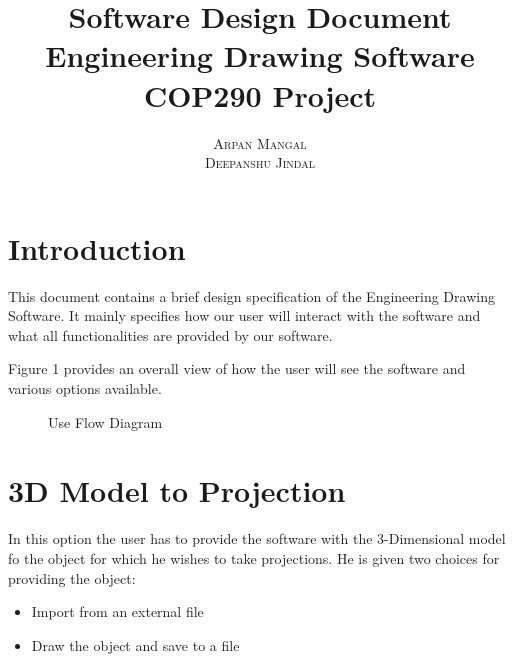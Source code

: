\documentclass[a4paper,12pt,openany]{report}
\title{\Huge \textbf{Software Design Document}
 \\
 \Huge \textbf{ Engineering Drawing Software} \vspace{10pt}\\\huge{COP290 Project }}
\author{\textsc{Arpan Mangal}
 \\
 \textsc{Deepanshu Jindal}}
\begin{document}
\maketitle



\chapter*{Introduction}
This document contains a brief design specification of the Engineering Drawing Software. It mainly specifies how our user will interact with the software and what all functionalities are provided by our software.

Figure 1 provides an overall view of how the user will see the software and various options available.
\begin{figure}[h]
	\centering
	\caption{Use Flow Diagram}
\end{figure}


\chapter*{3D Model to Projection}
In this option the user has to provide the software with the 3-Dimensional model fo the object for which he wishes to take projections. He is given two choices for providing the object:
\begin{itemize}
  \item Import from an external file
  \item Draw the object and save to a file
\end{itemize}
\end{document}
